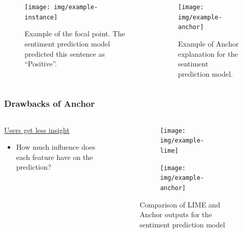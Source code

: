 \documentclass[aspectratio=169]{slide-en}
\begin{document}
\begin{frame}{}
  \begin{columns}[]
    \begin{column}{0.35\textwidth}
      \begin{figure}
        \centering
        \texttt{[image: img/example-instance]}
        \caption{%
          Example of the focal point.
          The sentiment prediction model predicted this sentence as ``Positive''.
        }
      \end{figure}
    \end{column}
    \begin{column}{0.4\textwidth}
      \vspace{0.7em}
      \begin{figure}
        \texttt{[image: img/example-anchor]}
        \vspace{-0.5em}
        \caption{%
          Example of Anchor explanation for the sentiment prediction model.
        }
      \end{figure}
    \end{column}
  \end{columns}
\end{frame}

\subsubsection{Drawbacks of Anchor}

\begin{frame}{}
  \begin{columns}[]
    \begin{column}{0.45\textwidth}
      \underline{Users get less insight}

      \bigskip
      \begin{itemize}
        \item How much influence does each feature have on the prediction?
      \end{itemize}
    \end{column}
    \begin{column}{0.5\textwidth}
      \begin{figure}
        \begin{subfigure}[t]{\textwidth}
          \centering
          \texttt{[image: img/example-lime]}
        \end{subfigure}
        \begin{subfigure}[t]{\textwidth}
          \centering
          \vspace{0.5em}
          \texttt{[image: img/example-anchor]}
        \end{subfigure}
        \vspace{0.5em}
        \caption{Comparison of LIME and Anchor outputs for the sentiment prediction model}
      \end{figure}
    \end{column}
  \end{columns}
\end{frame}
\end{document}
